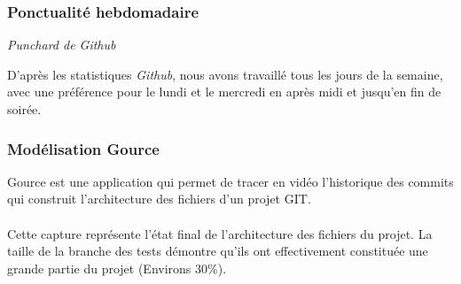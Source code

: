 \subsubsection{Ponctualité hebdomadaire}

\noindent
{}
\begin{center}
\textit{Punchard de Github}
\end{center}

D’après les statistiques \emph{Github}, nous avons travaillé tous les jours de la semaine, avec une préférence pour le lundi et le mercredi en après midi et jusqu’en fin de soirée.

\subsubsection{Modélisation Gource}

Gource est une application qui permet de tracer en vidéo l’historique des commits qui construit l’architecture des fichiers d’un projet GIT.

\paragraph{}
Cette capture représente l’état final de l’architecture des fichiers du projet. La taille de la branche des tests démontre qu'ils ont effectivement constituée une grande partie du projet (Environs 30\%).

